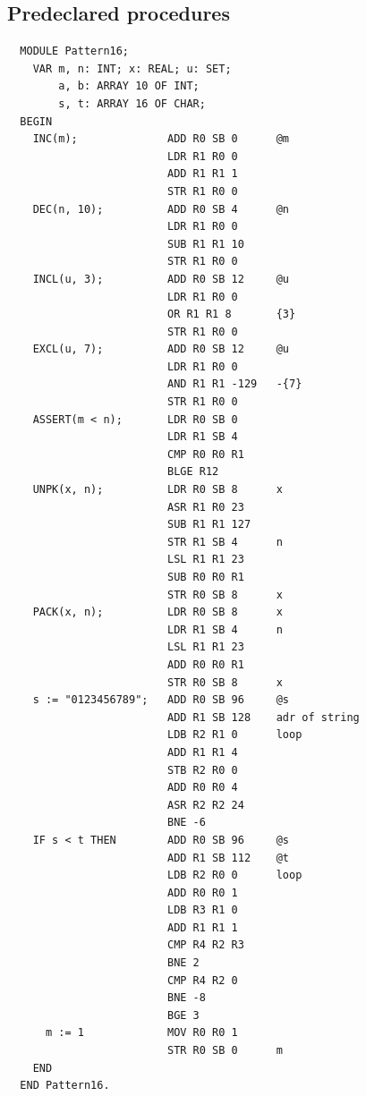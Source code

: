 \subsection{Predeclared procedures}
\begin{verbatim}
  MODULE Pattern16;
    VAR m, n: INT; x: REAL; u: SET;
        a, b: ARRAY 10 OF INT;
        s, t: ARRAY 16 OF CHAR;
  BEGIN
    INC(m);              ADD R0 SB 0      @m             
                         LDR R1 R0 0      
                         ADD R1 R1 1      
                         STR R1 R0 0      
    DEC(n, 10);          ADD R0 SB 4      @n
                         LDR R1 R0 0      
                         SUB R1 R1 10     
                         STR R1 R0 0      
    INCL(u, 3);          ADD R0 SB 12     @u
                         LDR R1 R0 0      
                         OR R1 R1 8       {3}
                         STR R1 R0 0      
    EXCL(u, 7);          ADD R0 SB 12     @u
                         LDR R1 R0 0      
                         AND R1 R1 -129   -{7}
                         STR R1 R0 0      
    ASSERT(m < n);       LDR R0 SB 0      
                         LDR R1 SB 4      
                         CMP R0 R0 R1     
                         BLGE R12         
    UNPK(x, n);          LDR R0 SB 8      x
                         ASR R1 R0 23     
                         SUB R1 R1 127    
                         STR R1 SB 4      n
                         LSL R1 R1 23     
                         SUB R0 R0 R1     
                         STR R0 SB 8      x
    PACK(x, n);          LDR R0 SB 8      x
                         LDR R1 SB 4      n
                         LSL R1 R1 23     
                         ADD R0 R0 R1     
                         STR R0 SB 8      x
    s := "0123456789";   ADD R0 SB 96     @s
                         ADD R1 SB 128    adr of string
                         LDB R2 R1 0      loop
                         ADD R1 R1 4      
                         STB R2 R0 0      
                         ADD R0 R0 4      
                         ASR R2 R2 24     
                         BNE -6           
    IF s < t THEN        ADD R0 SB 96     @s
                         ADD R1 SB 112    @t
                         LDB R2 R0 0      loop
                         ADD R0 R0 1
                         LDB R3 R1 0
                         ADD R1 R1 1
                         CMP R4 R2 R3
                         BNE 2
                         CMP R4 R2 0
                         BNE -8
                         BGE 3
      m := 1             MOV R0 R0 1
                         STR R0 SB 0      m
    END
  END Pattern16.
\end{verbatim}

